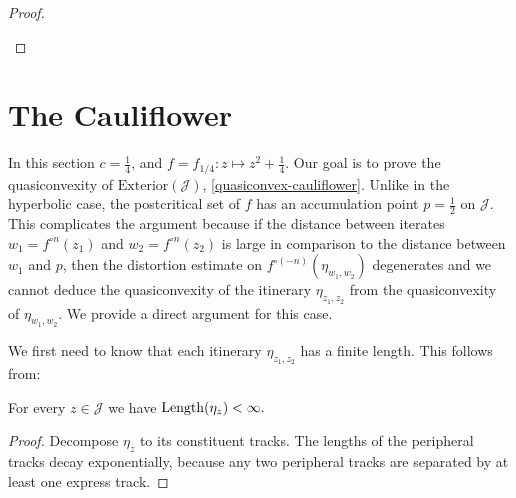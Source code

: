 \begin{proof}
\begin{enumerate}[label=\normalfont(\roman*)]
\begin{comment}
By a distortion estimate
\begin{equation*}
\Length\left(\eta_{z_{0},z_{1}}\right)\asymp\frac{\Length\left(\eta_{w_0,w_1}\right)}{\left|\left(f^{\circ n}\right)'\left(\zeta\right)\right|}
\end{equation*}
 for some point $\zeta \in \mathcal{J}$. The denominator grows
with $n$ exponentially at rate $\theta$, while the numerator has
a bound of the form 
\[
\Length\left(\eta_{w_1,w_2}\right)\lesssim\left|w_1-w_2\right|\lesssim\theta^{n}\left|z_{1}-z_{2}\right|.
\]
Altogether 
\[
\Length\left(\eta_{z_{1},z_{2}}\right)\lesssim\frac{\theta^{n}\left|z_{1}-z_{2}\right|}{\theta^{n}}=\left|z_{1}-z_{2}\right|
\]
 so $\eta_{z_{1},z_{2}}$ is a quasiconvexity certificate.
\end{comment}

\end{enumerate}
\end{proof}

\section{The Cauliflower}
In this section $c=\frac 14$, and $f=f_{1/4}: z\mapsto z^2+ \frac 14$.
Our goal is to prove the quasiconvexity of $\mathrm{Exterior}(\mathcal{J})$, \cref{quasiconvex-cauliflower}.
Unlike in the hyperbolic case, the postcritical set of $f$ has an accumulation point $p=\frac 12$ on $\mathcal J$. This complicates the argument because if the distance between iterates $w_1=f^{\circ n}(z_1)$ and $w_2=f^{\circ n}(z_2)$ is large in comparison to the distance between $w_1$ and $p$, then the distortion estimate on $f^{\circ (-n)}(\eta_{w_1,w_2})$ degenerates and we cannot deduce the quasiconvexity of the itinerary $\eta_{z_1,z_2}$ from the quasiconvexity of $\eta_{w_1,w_2}$. We provide a direct argument for this case.

We first need to know that each itinerary $\eta_{z_1,z_2}$ has a finite length. This follows from:
\begin{proposition}
	For every $z \in \mathcal J$ we have $\operatorname{Length}(\eta_z)<\infty.$
\end{proposition}

\begin{proof}
Decompose $\eta_z$ to its constituent tracks. The lengths of the peripheral tracks decay exponentially, because any two peripheral tracks are separated by at least one express track.
\end{proof}

